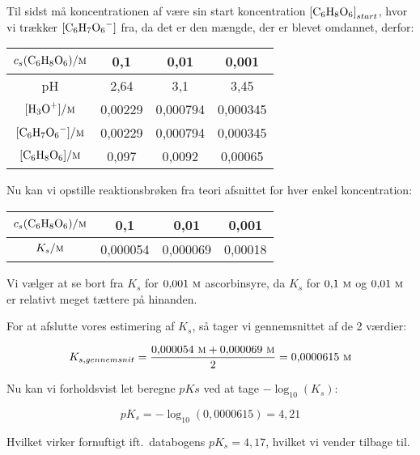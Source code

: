 Til sidst må koncentrationen af  være sin start koncentration ${[\ce{C6H8O6}]}_{start}$,
hvor vi trækker ${[\ce{C6H7O6-}]}$ fra, da det er den mængde, der er blevet omdannet, derfor:

\begin{table}[h]
    \centering
    \begin{tabular}{|c|c|c|c|}
    \hline
    $c_s(\ce{C6H8O6})/\textsc{m}$ & 0{,}1 & 0{,}01 & 0{,}001 \\ \hline
    pH & 2{,}64 & 3{,}1 & 3{,}45 \\ \hline
    $[\ce{H3O+}]/\textsc{m}$ & 0{,}00229 & 0{,}000794 & 0{,}000345 \\ \hline
    $[\ce{C6H7O6-}]/\textsc{m}$ & 0{,}00229 & 0{,}000794 & 0{,}000345 \\ \hline
    $[\ce{C6H8O6}]/\textsc{m}$ & 0{,}097 & 0{,}0092 & 0{,}00065 \\ \hline
    \end{tabular}
\end{table}

Nu kan vi opstille reaktionsbrøken fra teori afsnittet for hver enkel koncentration:

\begin{table}[h]
    \centering
    \begin{tabular}{|c|c|c|c|}
    \hline
    $c_s(\ce{C6H8O6})/\textsc{m}$ & 0{,}1 & 0{,}01 & 0{,}001 \\ \hline
    $K_s/\textsc{m}$ & 0{,}000054 & 0{,}000069 & 0{,}00018 \\ \hline
    \end{tabular}
\end{table}

Vi vælger at se bort fra $K_s$ for $0{,}001\ \textsc{m}$ ascorbinsyre,
da $K_s$ for $0{,}1\ \textsc{m}$ og $0{,}01\ \textsc{m}$ er relativt meget tættere på hinanden.

For at afslutte vores estimering af $K_s$, så tager vi gennemsnittet af de 2 værdier:

\[
    K_{s,gennemsnit}=\frac{0{,}000054\ \textsc{m} +0{,}000069\ \textsc{m}}{2}=0{,}0000615\ \textsc{m}
\]

Nu kan vi forholdsvist let beregne $pKs$ ved at tage $-\log_{10}(K_s)$:

\[
    pK_s=-\log_{10}(0{,}0000615)=4{,}21
\]

Hvilket virker fornuftigt ift.~databogens $pK_s=4{,}17$, hvilket vi vender tilbage til.